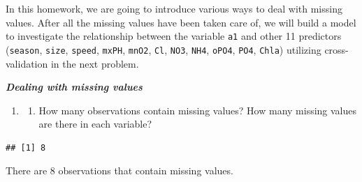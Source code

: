\documentclass[]{article}
\newenvironment{Shaded}{\begin{snugshade}}{\end{snugshade}}
\newcommand{\KeywordTok}[1]{\textcolor[rgb]{0.13,0.29,0.53}{\textbf{#1}}}
\newcommand{\DecValTok}[1]{\textcolor[rgb]{0.00,0.00,0.81}{#1}}
\newcommand{\StringTok}[1]{\textcolor[rgb]{0.31,0.60,0.02}{#1}}
\newcommand{\ControlFlowTok}[1]{\textcolor[rgb]{0.13,0.29,0.53}{\textbf{#1}}}
\newcommand{\OperatorTok}[1]{\textcolor[rgb]{0.81,0.36,0.00}{\textbf{#1}}}
\newcommand{\NormalTok}[1]{#1}
\providecommand{\tightlist}{%
  \setlength{\itemsep}{0pt}\setlength{\parskip}{0pt}}
\begin{document}
In this homework, we are going to introduce various ways to deal with
missing values. After all the missing values have been taken care of, we
will build a model to investigate the relationship between the variable
\texttt{a1} and other 11 predictors (\texttt{season}, \texttt{size},
\texttt{speed}, \texttt{mxPH}, \texttt{mnO2}, \texttt{Cl}, \texttt{NO3},
\texttt{NH4}, \texttt{oPO4}, \texttt{PO4}, \texttt{Chla}) utilizing
cross-validation in the next problem.

\textbf{\emph{Dealing with missing values}}

\begin{enumerate}
\def\labelenumi{\arabic{enumi}.}
\setcounter{enumi}{2}
\item
  \begin{enumerate}
  \tightlist
  \item
    How many observations contain missing values? How many missing
    values are there in each variable?
  \end{enumerate}
\end{enumerate}

\begin{Shaded}
\end{Shaded}

\begin{verbatim}
## [1] 8
\end{verbatim}

There are 8 observations that contain missing values.
\end{document}
